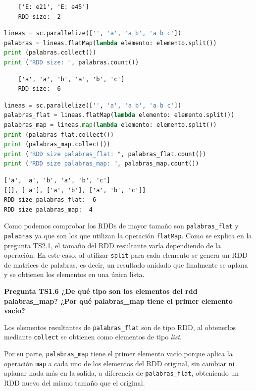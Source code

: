 \documentclass[10pt,swedish, openany]{book}
\begin{document}
\begin{verbatim}
    ['E: e21', 'E: e45']
    RDD size:  2
\end{verbatim}

\begin{lstlisting}[language=Python, caption=Ejemplo 4 TS1.5]
lineas = sc.parallelize(['', 'a', 'a b', 'a b c'])
palabras = lineas.flatMap(lambda elemento: elemento.split())
print (palabras.collect())
print ("RDD size: ", palabras.count())
\end{lstlisting}

\begin{verbatim}
    ['a', 'a', 'b', 'a', 'b', 'c']
    RDD size:  6
\end{verbatim}

\begin{lstlisting}[language=Python, caption=Ejemplo 5 TS1.5]
lineas = sc.parallelize(['', 'a', 'a b', 'a b c'])
palabras_flat = lineas.flatMap(lambda elemento: elemento.split())
palabras_map = lineas.map(lambda elemento: elemento.split())
print (palabras_flat.collect())
print (palabras_map.collect())
print ("RDD size palabras_flat: ", palabras_flat.count())
print ("RDD size palabras_map: ", palabras_map.count())
\end{lstlisting}

\begin{verbatim}
['a', 'a', 'b', 'a', 'b', 'c']
[[], ['a'], ['a', 'b'], ['a', 'b', 'c']]
RDD size palabras_flat:  6
RDD size palabras_map:  4
\end{verbatim}

Como podemos comprobar los RDDs de mayor tamaño son \texttt{palabras\_flat} y \texttt{palabras} ya que son los que utilizan la operación \texttt{flatMap}. Como se explica en la pregunta TS2.1, el tamaño del RDD resultante varía dependiendo de la operación. En este caso, al utilizar \texttt{split} para cada elemento se genera un RDD de matrices de palabras, es decir, un resultado anidado que finalmente se aplana y se obtienen los elementos en una única lista.

\vspace{0.8em}

\textbf{Pregunta TS1.6 ¿De qué tipo son los elementos del rdd palabras\_map? ¿Por qué palabras\_map tiene el primer elemento vacío?}

Los elementos resultantes de \texttt{palabras\_flat} son de tipo RDD, al obtenerlos mediante \texttt{collect} se obtienen como elementos de tipo \textit{list}.

Por su parte, \texttt{palabras\_map} tiene el primer elemento vacío porque aplica la operación \texttt{map} a cada uno de los elementos del RDD original, sin cambiar ni aplanar nada más en la salida, a diferencia de \texttt{palabras\_flat}, obteniendo un RDD nuevo del mismo tamaño que el original.
\end{document}
